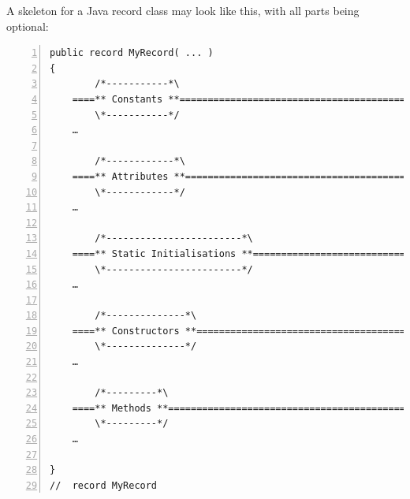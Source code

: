 \documentclass[11pt,a4paper, titlepage, parskip=half, headsepline, footsepline, cleardoublepage=current, headheight=1cm]{scrbook}
\begin{document}
A skeleton for a Java record class may look like this, with all parts being optional:
\begin{lstlisting}[numbers=left,caption={Record Skeleton}]
public record MyRecord( ... ) 
{
        /*-----------*\
    ====** Constants **==============================================
        \*-----------*/
    …
        
        /*------------*\
    ====** Attributes **=============================================
        \*------------*/
    …
        
        /*------------------------*\
    ====** Static Initialisations **=================================
        \*------------------------*/
    …
        
        /*--------------*\
    ====** Constructors **===========================================
        \*--------------*/
    …
        
        /*---------*\
    ====** Methods **================================================
        \*---------*/
    …
                
}
//  record MyRecord
\end{lstlisting}
 
\end{document}
